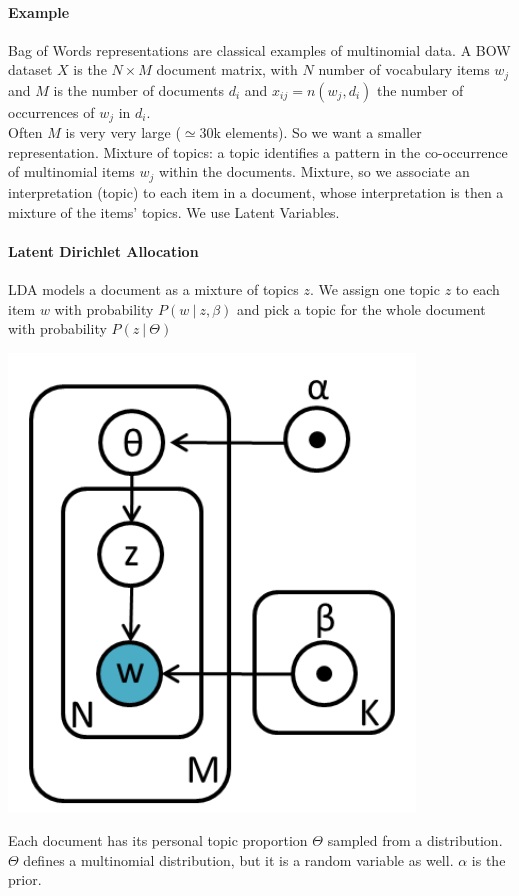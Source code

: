\documentclass[10pt]{report}
\begin{document}
\paragraph{Example} Bag of Words representations are classical examples of multinomial data. A BOW dataset $X$ is the $N\times M$ document matrix, with $N$ number of vocabulary items $w_j$ and $M$ is the number of documents $d_i$ and $x_{ij} = n(w_j,d_i)$ the number of occurrences of $w_j$ in $d_i$.\\
Often $M$ is very very large ($\simeq 30$k elements). So we want a smaller representation. Mixture of topics: a topic identifies a pattern in the co-occurrence of multinomial items $w_j$ within the documents. Mixture, so we associate an interpretation (topic) to each item in a document, whose interpretation is then a mixture of the items' topics. We use Latent Variables.
\paragraph{Latent Dirichlet Allocation} LDA models a document as a mixture of topics $z$. We assign one topic $z$ to each item $w$ with probability $P(w\:|\:z,\beta)$ and pick a topic for the whole document with probability $P(z\:|\:\Theta)$
\begin{center}
	\includegraphics[scale=0.5]{40.png}
\end{center}
Each document has its personal topic proportion $\Theta$ sampled from a distribution. $\Theta$ defines a multinomial distribution, but it is a random variable as well. $\alpha$ is the prior.
\end{document}

